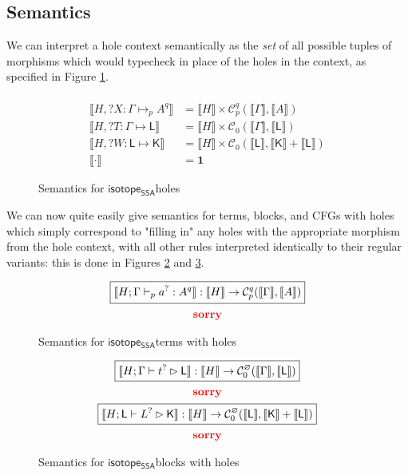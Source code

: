 \documentclass[acmsmall,screen,review]{acmart}
\newcommand{\sorry}{\textcolor{red}{\textbf{sorry}}}
\newcommand{\mc}[1]{\ensuremath{\mathcal{#1}}}
\newcommand{\mb}[1]{\ensuremath{\mathbf{#1}}}
\newcommand{\ms}[1]{\ensuremath{\mathsf{#1}}}
\newcommand{\mhole}[1]{{#1}^?}
\newcommand{\lhole}[1]{?#1}
\newcommand{\mhasty}[6]{#1;#2 \vdash_{#3} #4: {#5}^{#6}}
\newcommand{\mhaslb}[4]{#1;#2 \vdash #3 \rhd #4}
\newcommand{\mlhaslb}[4]{#1;#2 \vdash #3 \rhd #4}
\newcommand{\tyhole}[5]{#1: #2 \mapsto_{#3} {#4}^{#5}}
\newcommand{\blkhole}[3]{#1: #2 \mapsto #3}
\newcommand{\cfghole}[3]{#1: #2 \mapsto #3}
\newcommand{\dnt}[1]{\llbracket{#1}\rrbracket}
\newcommand{\isotopessa}{\ms{isotope_{SSA}}}
\begin{document}
\subsection{Semantics}

We can interpret a hole context semantically as the \textit{set} of all possible
tuples of morphisms which would typecheck in place of the holes in the context,
as specified in Figure \ref{fig:holes-semantics}.
\begin{figure}
  \begin{align*}
      \\
    \dnt{H, \tyhole{\lhole{X}}{\Gamma}{p}{A}{q}}
      &= \dnt{H} \times \mc{C}_p^q(\dnt{\Gamma}, \dnt{A}) 
      \\
    \dnt{H, \blkhole{\lhole{T}}{\Gamma}{\ms{L}}}
      &= \dnt{H} \times \mc{C}_0(\dnt{\Gamma}, \dnt{\ms{L}}) 
      \\
    \dnt{H, \cfghole{\lhole{W}}{\ms{L}}{\ms{K}}}
      &= \dnt{H} \times \mc{C}_0(\dnt{\ms{L}}, \dnt{\ms{K}} + \dnt{\ms{L}}) 
      \\
    \dnt{\cdot} 
      &= \mb{1}
  \end{align*}
  \caption{Semantics for \isotopessa holes}
  \label{fig:holes-semantics}
\end{figure}
We can now quite easily give semantics for terms, blocks, and CFGs with holes
which simply correspond to "filling in" any holes with the appropriate morphism
from the hole context, with all other rules interpreted identically to their
regular variants: this is done in Figures \ref{fig:ssa-term-holes-semantics} and
\ref{fig:ssa-block-holes-semantics}.

\begin{figure}
  \begin{gather*}
    \boxed{
      \dnt{\mhasty{H}{\Gamma}{p}{\mhole{a}}{A}{q}}
      : \dnt{H} \to \mc{C}_p^q(\dnt{\Gamma}, \dnt{A})}
      \\
    \sorry
  \end{gather*}
  \caption{Semantics for \isotopessa terms with holes}
  \label{fig:ssa-term-holes-semantics}
\end{figure}

\begin{figure}
  \begin{gather*}
    \boxed{
      \dnt{\mhaslb{H}{\Gamma}{\mhole{t}}{\ms{L}}}
      : \dnt{H} \to \mc{C}_0^\varnothing(\dnt{\Gamma}, \dnt{\ms{L}})}
      \\
    \sorry
      \\  
    \boxed{
      \dnt{\mlhaslb{H}{\ms{L}}{\mhole{L}}{\ms{K}}}
      : \dnt{H} \to \mc{C}_0^\varnothing(\dnt{\ms{L}}, \dnt{\ms{K}} + \dnt{\ms{L}})}
      \\
    \sorry
  \end{gather*}
  \caption{Semantics for \isotopessa blocks with holes}
  \label{fig:ssa-block-holes-semantics}
\end{figure}
\end{document}
